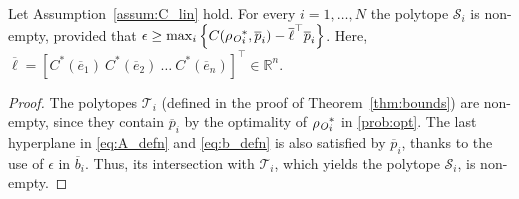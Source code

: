 \begin{prop}\label{prop:nonempty}
    Let Assumption~\ref{assum:C_lin} hold. For every $i=1,\ldots,N$ the polytope $\mathcal{S}_i$ is non-empty, provided that $\epsilon \geq \max_i\left\{ C( {\rho_{\textit{O}}}_i^\ast, \overline{p}_i) -
    \overline{\ell}^\top \overline{p}_i\right\}$. Here,
    $\overline{\ell}={[C^\ast( \overline{e}_1)\ C^\ast(\overline{e}_2)\ \ldots\ C^\ast( \overline{e}_n)]}^\top\in \mathbb{R}^n$.
\end{prop}
\begin{proof}
    The polytopes $ \mathcal{T}_i$ (defined in the proof of Theorem~\ref{thm:bounds}) are non-empty, since they
    contain $ \overline{p}_i$ by the optimality of $
    {\rho_{\textit{O}}}_i^\ast$ in \eqref{prob:opt}.
    The last hyperplane in \eqref{eq:A_defn} and
    \eqref{eq:b_defn} is also satisfied by $
    \overline{p}_i$, thanks to the use of $\epsilon$ in $\overline b_i$.
    Thus, its intersection with $ \mathcal{T}_i$, which
    yields the polytope $ \mathcal{S}_i$, is non-empty.
\end{proof}
